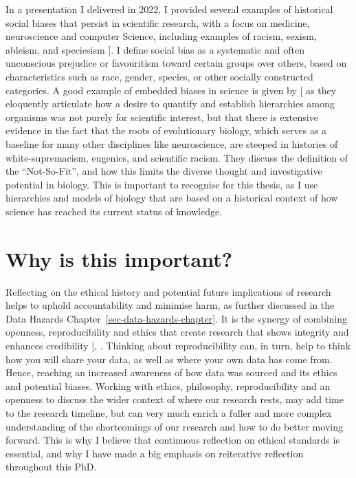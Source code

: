 \documentclass[
  11pt,
  letterpaper,
]{scrreprt}
\begin{document}
In a presentation I delivered in 2022, I provided several examples of
historical social biases that persist in scientific research, with a
focus on medicine, neuroscience and computer Science, including examples
of racism, sexism, ableism, and speciesism
{[}\citeproc{ref-garcia2022Thinkinga}{379}{]}. I define social bias as a
systematic and often unconscious prejudice or favouritism toward certain
groups over others, based on characteristics such as race, gender,
species, or other socially constructed categories. A good example of
embedded biases in science is given by
{[}\citeproc{ref-branch2022Discussionsa}{419}{]} as they eloquently
articulate how a desire to quantify and establish hierarchies among
organisms was not purely for scientific interest, but that there is
extensive evidence in the fact that the roots of evolutionary biology,
which serves as a baseline for many other disciplines like neuroscience,
are steeped in histories of white-supremacism, eugenics, and scientific
racism. They discuss the definition of the ``Not-So-Fit'', and how this
limits the diverse thought and investigative potential in biology. This
is important to recognise for this thesis, as I use hierarchies and
models of biology that are based on a historical context of how science
has reached its current status of knowledge.

\section{Why is this important?}\label{why-is-this-important}

Reflecting on the ethical history and potential future implications of
research helps to uphold accountability and minimise harm, as further
discussed in the Data Hazards Chapter~\ref{sec-data-hazards-chapter}. It
is the synergy of combining openness, reproducibility and ethics that
create research that shows integrity and enhances credibility
{[},
\citeproc{ref-zhaksylyk2023Research}{421}{]}. Thinking about
reproducibility can, in turn, help to think how you will share your
data, as well as where your own data has come from. Hence, reaching an
increased awareness of how data was sourced and its ethics and potential
biases. Working with ethics, philosophy, reproducibility and an openness
to discuss the wider context of where our research rests, may add time
to the research timeline, but can very much enrich a fuller and more
complex understanding of the shortcomings of our research and how to do
better moving forward. This is why I believe that continuous reflection
on ethical standards is essential, and why I have made a big emphasis on
reiterative reflection throughout this PhD.
\end{document}
